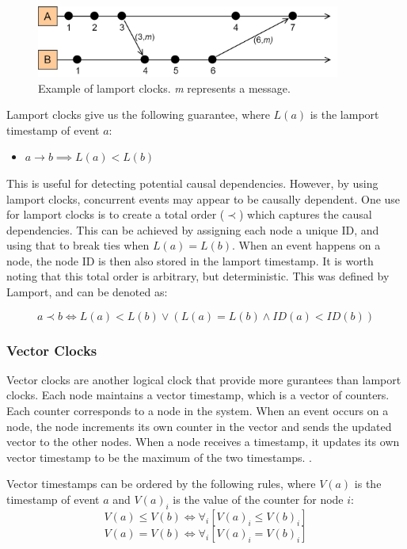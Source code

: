 \documentclass[12pt]{article}
\begin{document}
\begin{figure}
    \centering
    \includegraphics[width=10cm]{LamportClocks.jpg}
    \caption{Example of lamport clocks. \textit{m} represents a message.}
    \label{fig:lamport}
\end{figure}

Lamport clocks give us the following guarantee, where $L(a)$ is the lamport timestamp of event $a$: 
\begin{itemize}
    \item $a \rightarrow b \implies  L(a) < L(b)$
\end{itemize}
This is useful for detecting potential causal dependencies. However, by using lamport clocks, concurrent events may appear to be causally dependent. One use for lamport clocks is to create a total order ($\prec$) which captures the causal dependencies. This can be achieved by assigning each node a unique ID, and using that to break ties when $L(a) = L(b)$. When an event happens on a node, the node ID is then also stored in the lamport timestamp. It is worth noting that this total order is arbitrary, but deterministic. This was defined by Lamport\cite{lamport1978time}, and can be denoted as:\par
\[a \prec b \iff L(a) < L(b) \lor (L(a) = L(b) \land ID(a) < ID(b))\]

\subsubsection{Vector Clocks}
Vector clocks are another logical clock that provide more gurantees than lamport clocks. Each node maintains a vector timestamp, which is a vector of counters. Each counter corresponds to a node in the system.
When an event occurs on a node, the node increments its own counter in the vector and sends the updated vector to the other nodes.
When a node receives a timestamp, it updates its own vector timestamp to be the maximum of the two timestamps. \cite{mattern1989virtual}.\par

Vector timestamps can be ordered by the following rules, where $V(a)$ is the timestamp of event $a$ and $V(a)_i$ is the value of the counter for node $i$:
\[V(a) \leq V(b) \iff \forall_i [V(a)_i \leq V(b)_i]  \]
\[V(a) = V(b) \iff \forall_i [V(a)_i = V(b)_i]\]
\end{document}

